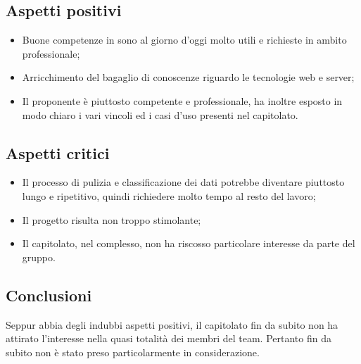 \subsection{Aspetti positivi}
\begin{itemize}
\item Buone competenze in  sono al giorno d’oggi molto utili e richieste in ambito professionale;
\item Arricchimento del bagaglio di conoscenze riguardo le tecnologie web e server;
\item Il proponente è piuttosto competente e professionale, ha inoltre esposto in modo chiaro i vari vincoli ed i casi d'uso presenti nel capitolato.
\end{itemize}
\subsection{Aspetti critici}
\begin{itemize}
\item Il processo di pulizia e classificazione dei dati potrebbe diventare piuttosto lungo e ripetitivo, quindi richiedere molto tempo al resto del lavoro;
\item Il progetto risulta non troppo stimolante;
\item Il capitolato, nel complesso, non ha riscosso particolare interesse da parte del gruppo.
\end{itemize}
\subsection{Conclusioni}
Seppur abbia degli indubbi aspetti positivi, il capitolato fin da subito non ha attirato l'interesse nella quasi totalità dei membri del team. Pertanto fin da subito non è stato preso particolarmente in considerazione.
